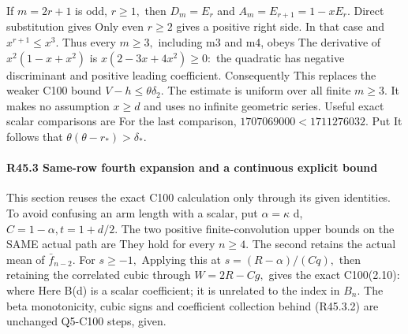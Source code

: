 If \(m=2r+1\) is odd, \(r\ge 1,\allowbreak \) then \(D_m=E_r\) and \(A_m=E_{r+1}=1-xE_r.\)
Direct substitution gives
Only even \(r\ge 2\) gives a positive right side. In that case
and \(x^{r+1}\le x^3.\) Thus every \(m\ge 3,\allowbreak \) including m3 and m4, obeys
The derivative of \(x^2(1-x+x^2)\) is \(x(2-3x+4x^2)\ge 0:\) the quadratic
has negative discriminant and positive leading coefficient. Consequently
This replaces the weaker C100 bound \(V-h\le \theta \delta_2.\) The estimate is
uniform over all finite \(m\ge 3.\) It makes no assumption \(x\ge d\) and uses no
infinite geometric series. Useful exact scalar comparisons are
For the last comparison, \(1707069000<1711276032.\) Put
It follows that \(\theta(\theta-r_*)>\delta_*.\)

\paragraph{R45.3 Same-row fourth expansion and a continuous explicit bound}

This section reuses the exact C100 calculation only through its
given identities. To avoid confusing an arm length with a scalar,
put \(\alpha=\kappa\) d, \(C=1-\alpha,\allowbreak  t=1+d/2.\) The two positive finite-convolution
upper bounds on the SAME actual path are
They hold for every \(n\ge 4.\) The second retains the actual mean of \(\bar f_{n-2}.\)
For \(s\ge -1,\allowbreak \)
Applying this at \(s=(R-\alpha)/(Cq),\allowbreak \) then retaining the correlated cubic
through \(W=2R-Cg,\allowbreak \) gives the exact C100(2.10):
where
Here B(d) is a scalar coefficient; it is unrelated to the index in \(B_n.\)
The beta monotonicity, cubic signs and coefficient collection behind
(R45.3.2) are unchanged Q5-C100 steps, given.

